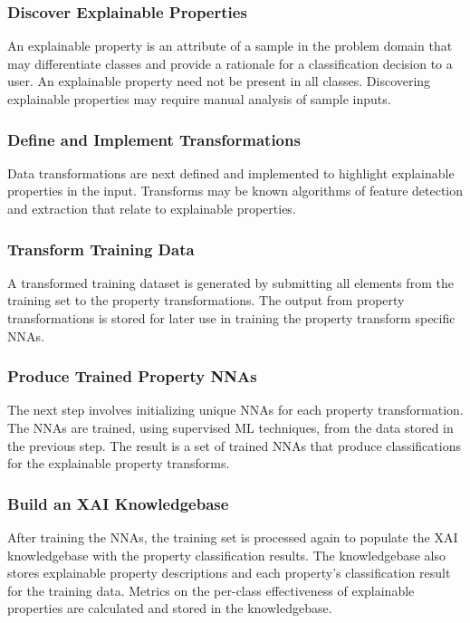 \documentclass[conference]{IEEEtran}
\begin{document}
\subsubsection{Discover Explainable Properties}
An explainable property is an attribute of a sample in the problem domain that may differentiate classes and provide a rationale for a classification decision to a user.   An explainable property need not be present in all classes.  Discovering explainable properties may require manual analysis of sample inputs.

\subsubsection{Define and Implement Transformations}
Data transformations are next defined and implemented to highlight explainable properties in the input.  Transforms may be known algorithms of feature detection and extraction that relate to explainable properties.

\subsubsection{Transform Training Data} 
A transformed training dataset is generated by submitting all elements from the training set to the property transformations.  The output from property transformations is stored for later use in training the property transform specific NNAs. 

\subsubsection{Produce Trained Property NNAs}
The next step involves initializing unique NNAs for each property transformation.  The NNAs are trained, using supervised ML techniques, from the data stored in the previous step.  The result is a set of trained NNAs that produce classifications for the explainable property transforms.

\subsubsection{Build an XAI Knowledgebase}
After training the NNAs, the training set is processed again to populate the XAI knowledgebase with the property classification results.  The knowledgebase also stores explainable property descriptions and each property's classification result for the training data.  Metrics on the per-class effectiveness of explainable properties are calculated and stored in the knowledgebase.
\end{document}
